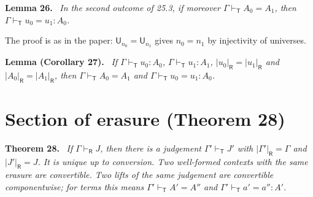 \documentclass[11pt]{article}
\newenvironment{theorem}[1]{\par\medskip\noindent\textbf{Theorem #1.}\ \itshape}{\par\medskip}
\newenvironment{lemma}[1]{\par\medskip\noindent\textbf{Lemma #1.}\ \itshape}{\par\medskip}
\theoremstyle{definition}
\theoremstyle{remark}
\newcommand{\vdashT}{\vdash_{\mathsf T}}
\newcommand{\U}{\mathsf U}
\newcommand{\vdashR}{\vdash_{\mathsf R}}
\newcommand{\erR}[1]{|#1|_{\mathsf R}}
\begin{document}
\begin{lemma}{26}
In the second outcome of 25.3, if moreover $\Gamma\vdashT A_0=A_1$, then
$\Gamma\vdashT u_0=u_1:A_0$.
\end{lemma}
The proof is as in the paper: $\U_{n_0}=\U_{n_1}$ gives $n_0=n_1$ by
injectivity of universes.

\begin{lemma}{(Corollary 27)}
If $\Gamma\vdashT u_0:A_0$, $\Gamma\vdashT u_1:A_1$, $\erR{u_0}=\erR{u_1}$ and
$\erR{A_0}=\erR{A_1}$, then $\Gamma\vdashT A_0=A_1$ and $\Gamma\vdashT u_0=u_1:A_0$.
\end{lemma}

\section{Section of erasure (Theorem 28)}\label{sec:section}

\begin{theorem}{28}
If $\Gamma\vdashR J$, then there is a judgement $\Gamma'\vdashT J'$ with
$\erR{\Gamma'}=\Gamma$ and $\erR{J'}=J$. It is unique up to conversion. Two
well-formed contexts with the same erasure are convertible. Two lifts of
the same judgement are convertible componentwise; for terms this means
$\Gamma'\vdashT A'=A''$ and $\Gamma'\vdashT a'=a'':A'$.
\end{theorem}
\end{document}
